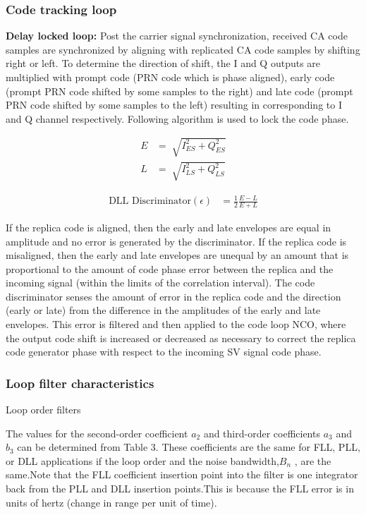 \subsubsection{Code tracking loop}
\textbf{Delay locked loop:}
Post the carrier signal synchronization, received CA code samples are synchronized by aligning with replicated CA code samples by shifting right or left. To determine the direction of shift, the I and Q outputs are multiplied with prompt code (PRN code which is phase aligned), early code (prompt PRN code shifted by some samples to the right) and late code (prompt PRN code shifted by some samples to the left) resulting in corresponding to I and Q channel respectively. Following algorithm is used to lock the code phase.

\begin{align}
	E&=\sqrt[]{I_{ES}^2+Q_{ES}^2}\\
	L&=\sqrt[]{I_{LS}^2+Q_{LS}^2}
\end{align}

\begin{align}
	\text{DLL Discriminator} (\epsilon)&=\frac{1}{2}\frac{E-L}{E+L}
\end{align}

\noindent If the replica code is aligned, then the early and late envelopes are equal in amplitude and no error is generated by the discriminator. If the replica code is misaligned, then the early and late envelopes are unequal by an amount that is proportional to the amount of code phase error between the replica and the incoming signal (within the limits of the correlation interval). The code discriminator senses the amount of error in the replica code and the direction (early or late) from the difference in the amplitudes of the early and late envelopes. This
error is filtered and then applied to the code loop NCO, where the output code shift is increased or decreased as necessary to correct the replica code generator phase with respect to the incoming SV signal code phase.

\subsubsection{Loop filter characteristics}
\begin{table}[h]

\vspace{3mm}
\caption{Loop order filters}
\label{table:loop}
\end{table}
\noindent The values for the second-order coefficient $a_2$ and third-order coefficients $a_3$ and $b_3$ can be determined from Table 3. These coefficients are the same for FLL, PLL, or DLL applications if the loop
order and the noise bandwidth,$B_n$ , are the same.Note that the FLL coefficient insertion point into the filter is one integrator back from the PLL and DLL insertion points.This is because the FLL error is in units of hertz (change in range per unit of time).

